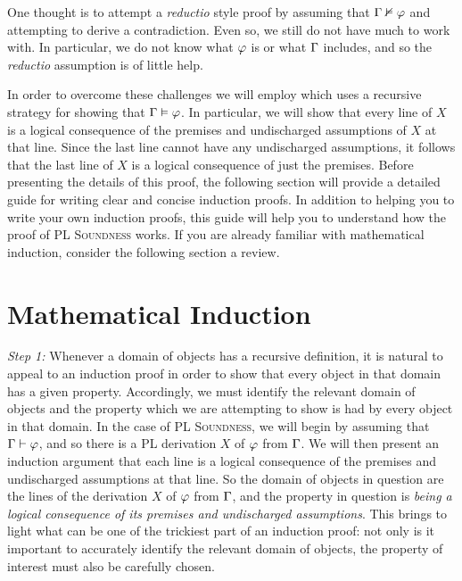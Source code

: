 One thought is to attempt a \textit{reductio} style proof by assuming that $\Gamma \nvDash \varphi$ and attempting to derive a contradiction. 
Even so, we still do not have much to work with.
In particular, we do not know what $\varphi$ is or what $\Gamma$ includes, and so the \textit{reductio} assumption is of little help.

In order to overcome these challenges we will employ  which uses a recursive strategy for showing that $\Gamma \vDash \varphi$.
In particular, we will show that every line of $X$ is a logical consequence of the premises and undischarged assumptions of $X$ at that line.
Since the last line cannot have any undischarged assumptions, it follows that the last line of $X$ is a logical consequence of just the premises.
Before presenting the details of this proof, the following section will provide a detailed guide for writing clear and concise induction proofs.
In addition to helping you to write your own induction proofs, this guide will help you to understand how the proof of \textsc{PL Soundness} works.
If you are already familiar with mathematical induction, consider the following section a review.







\section{Mathematical Induction}

\textit{Step 1:} 
Whenever a domain of objects has a recursive definition, it is natural to appeal to an induction proof in order to show that every object in that domain has a given property.
Accordingly, we must identify the relevant domain of objects and the property which we are attempting to show is had by every object in that domain.
In the case of \textsc{PL Soundness}, we will begin by assuming that $\Gamma \vdash \varphi$, and so there is a PL derivation $X$ of $\varphi$ from $\Gamma$.
We will then present an induction argument that each line is a logical consequence of the premises and undischarged assumptions at that line.
So the domain of objects in question are the lines of the derivation $X$ of $\varphi$ from $\Gamma$, and the property in question is \textit{being a logical consequence of its premises and undischarged assumptions}. 
This brings to light what can be one of the trickiest part of an induction proof: not only is it important to accurately identify the relevant domain of objects, the property of interest must also be carefully chosen.

